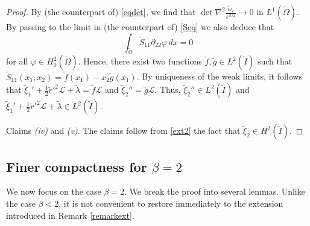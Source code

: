\documentclass[a4, 11pt, reqno, final]{amsart}
\newcommand{\calL}{\mathcal{L}}
\newcommand\e{\varepsilon}
\theoremstyle{plain}%
\newcommand{\QED}{\hspace{1ex}\hfill$\blacksquare$\vspace{2ex}}
\begin{document}
\begin{proof}
		By (the counterpart of) \eqref{eqdet}, we find that
		$\det \nabla^2\frac{\widetilde{w}_\e}{\e^{\beta/2}}\to 0$ in $L^1(\widetilde{\Omega})$. By passing to the limit in (the counterpart of) \eqref{Seq} we also deduce that
		$$
		\int_{\widetilde{\Omega}} \widetilde{S}_{11}\partial_{22}\varphi\, dx=0
		$$
		for all $\varphi\in H^2_0(\widetilde{\Omega})$. Hence, there exist two functions $\widetilde{f},\widetilde{g}\in L^2(\widetilde{I})$ such that
		$
		\widetilde{S}_{11}(x_1,x_2)=\widetilde{f}(x_1)-x_2 \widetilde{g}(x_1)
		$.
		By uniqueness of the weak limits, it follows that  $\widetilde{\xi}_1' + \frac12 \widetilde{r}'^2\calL + \widetilde{\lambda} = \widetilde{f}\calL$ and	$\widetilde{\xi}_2'' = \widetilde{g}\calL$. Thus, $\widetilde{\xi}_2'' \in L^2(\widetilde{I})$ and $\widetilde{\xi}_1' + \frac12 \widetilde{r}'^2\calL + \widetilde{\lambda}  \in L^2(\widetilde{I})$.

		Claims \textit{(iv)} and \textit{(v)}. The claims follow from \eqref{ext2} the fact that $\widetilde{\xi}_2 \in H^2(\widetilde{I})$.
	\end{proof}


	\subsection{Finer compactness for $\beta=2$}

	We now focus on the case $\beta=2$. We break the proof into several lemmas. Unlike the case $\beta<2$, it is not convenient to restore immediately to the extension introduced in Remark \ref{remarkext}.
\end{document}

